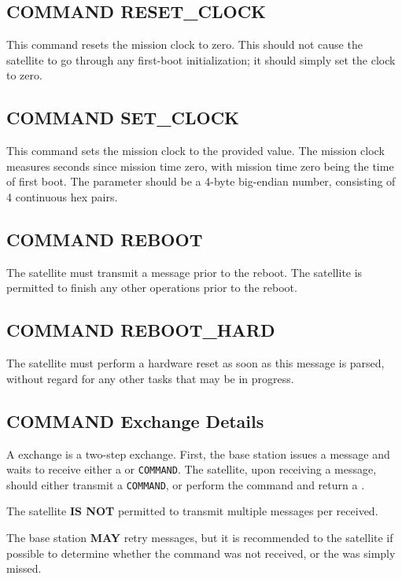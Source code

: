 \documentclass{article}
\begin{document}
  \subsection{COMMAND RESET\_CLOCK}
  This command resets the mission clock to zero. This should not cause the satellite
  to go through any first-boot initialization; it should simply set the clock to zero.
  
  \subsection{COMMAND SET\_CLOCK}
  This command sets the mission clock to the provided value. The mission clock measures
  seconds since mission time zero, with mission time zero being the time of first boot.
  The parameter should be a 4-byte big-endian number, consisting of 4 continuous hex
  pairs.
  
  \subsection{COMMAND REBOOT}
  The satellite must transmit a \macommand message prior to the reboot. The satellite
  is permitted to finish any other operations prior to the reboot.
  
  \subsection{COMMAND REBOOT\_HARD}
  The satellite must perform a hardware reset as soon as this message is parsed, without
  regard for any other tasks that may be in progress.
  
  \subsection{COMMAND Exchange Details}
  A \mcommand exchange is a two-step exchange. First, the base station issues a \mcommand message and waits to receive either
  a \macommand or \merror \texttt{COMMAND}. The satellite, upon receiving a \mcommand message, should either transmit a \merror 
  \texttt{COMMAND}, or perform the command and return a \macommand.
  
  The satellite \textbf{IS NOT} permitted to transmit multiple \macommand messages per \mcommand received.
  
  The base station \textbf{MAY} retry \mcommand messages, but it is recommended to \mquery the satellite
  if possible to determine whether the command was not received, or the \macommand was simply missed.
  
\end{document}
